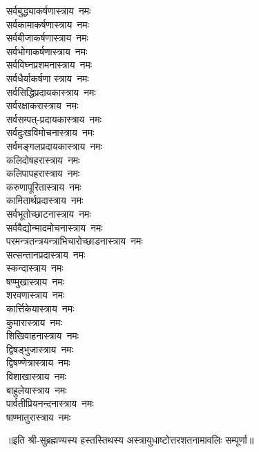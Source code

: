 \begin{flushleft}
\begin{multicols}{2}
सर्वबुद्ध्याकर्षणास्त्राय~नमः\\
सर्वकामाकर्षणास्त्राय~नमः\\
सर्वबीजाकर्षणास्त्राय~नमः\hfill{}\\
सर्वभोगाकर्षणास्त्राय~नमः\\
सर्वविघ्नप्रशमनास्त्राय~नमः\\
सर्वधैर्याकर्षणा स्त्राय~नमः\\
सर्वसिद्धिप्रदायकास्त्राय~नमः\\
सर्वरक्षाकरास्त्राय~नमः\\
सर्वसम्पत्-प्रदायकास्त्राय~नमः\\
सर्वदुःखविमोचनास्त्राय~नमः\\
सर्वमङ्गलप्रदायकास्त्राय~नमः\\
कलिदोषहरास्त्राय~नमः\\
कलिपापहरास्त्राय~नमः\hfill{}\\
करुणापूरितास्त्राय~नमः\\
कामितार्थप्रदास्त्राय~नमः\\
सर्वभूतोच्छाटनास्त्राय~नमः \\
सर्ववैद्योन्मादमोचनास्त्राय~नमः \\
परमन्त्रतन्त्रयन्त्राभिचारो\-च्छाडनास्त्राय~नमः\\
सत्सन्तानप्रदास्त्राय~नमः\\
स्कन्दास्त्राय~नमः\\
षण्मुखास्त्राय~नमः\\
शरवणास्त्राय~नमः\\
कार्त्तिकेयास्त्राय~नमः\hfill{}\\
कुमारास्त्राय~नमः\\
शिखिवाहनास्त्राय~नमः\\
द्विषड्भुजास्त्राय~नमः\\
द्विषण्णेत्रास्त्राय~नमः\\
विशाखास्त्राय~नमः\\
बाहुलेयास्त्राय~नमः\\
पार्वतीप्रियनन्दनास्त्राय~नमः\\
षाण्मातुरास्त्राय~नमः\\
\end{multicols}
\end{flushleft}
॥इति श्री-सुब्रह्मण्यस्य हस्तस्तिथस्य अस्त्रायुधाष्टोत्तरशतनामावलिः सम्पूर्णा॥
